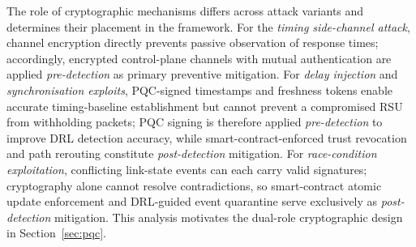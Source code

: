 The role of cryptographic mechanisms differs across attack variants and
determines their placement in the framework. For the \emph{timing
side-channel attack}, channel encryption directly prevents passive
observation of response times; accordingly, encrypted control-plane
channels with mutual authentication are applied \emph{pre-detection}
as primary preventive mitigation. For \emph{delay injection} and
\emph{synchronisation exploits}, PQC-signed timestamps and freshness
tokens enable accurate timing-baseline establishment but cannot prevent
a compromised RSU from withholding packets; PQC signing is therefore
applied \emph{pre-detection} to improve DRL detection accuracy, while
smart-contract-enforced trust revocation and path rerouting constitute
\emph{post-detection} mitigation. For \emph{race-condition exploitation},
conflicting link-state events can each carry valid signatures; cryptography
alone cannot resolve contradictions, so smart-contract atomic update
enforcement and DRL-guided event quarantine serve exclusively as
\emph{post-detection} mitigation. This analysis motivates the dual-role
cryptographic design in Section~\ref{sec:pqc}.


